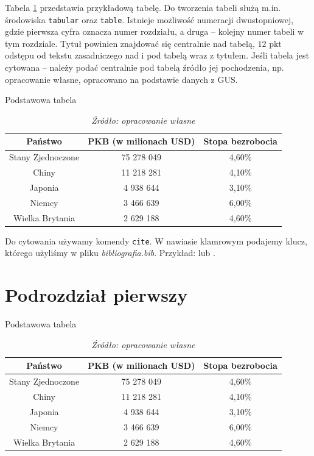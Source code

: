 \documentclass[polish,engineering]{wizthesis}
\begin{document}
Tabela \ref{tab:przykladowa} przedstawia przykładową tabelę. Do tworzenia tabeli służą m.in. środowiska \texttt{tabular} oraz \texttt{table}. Istnieje możliwość numeracji dwustopniowej, gdzie pierwsza cyfra oznacza numer rozdziału, a druga – kolejny numer tabeli w tym rozdziale. Tytuł powinien znajdować się centralnie nad tabelą, $12$ pkt odstępu od tekstu zasadniczego nad i pod tabelą wraz z tytułem. Jeśli tabela jest cytowana – należy podać centralnie pod tabelą źródło jej pochodzenia, np. opracowanie własne, opracowano na podstawie danych z GUS.
\begin{table}[ht]
  \caption{Podstawowa tabela}
  \centering
  \begin{tabular}{ccc}
    \hline
    \hline
    Państwo & PKB (w milionach USD) & Stopa bezrobocia \\ [0.5ex]
    \hline
    Stany Zjednoczone & 75 278 049 & 4,60\% \\
    Chiny             & 11 218 281 & 4,10\% \\
    Japonia           & 4 938 644  & 3,10\% \\
    Niemcy            & 3 466 639  & 6,00\% \\
    Wielka Brytania   & 2 629 188  & 4,60\% \\ [1ex]
    \hline
  \end{tabular}
  \caption*{\textit{Źródło: opracowanie własne}}
  \label{tab:przykladowa} 
\end{table}

Do cytowania używamy komendy \texttt{cite}. W nawiasie klamrowym podajemy klucz, którego użyliśmy w pliku \emph{bibliografia.bib}. Przykład: \cite{einstein} lub \cite[chap. 2]{latexcompanion}.


\section{Podrozdział pierwszy}

\begin{table}[ht]
  \caption{Podstawowa tabela}
  \centering
  \begin{tabular}{ccc}
    \hline
    \hline
    Państwo & PKB (w milionach USD) & Stopa bezrobocia \\ [0.5ex]
    \hline
    Stany Zjednoczone & 75 278 049 & 4,60\% \\
    Chiny             & 11 218 281 & 4,10\% \\
    Japonia           & 4 938 644  & 3,10\% \\
    Niemcy            & 3 466 639  & 6,00\% \\
    Wielka Brytania   & 2 629 188  & 4,60\% \\ [1ex]
    \hline
  \end{tabular}
  \caption*{\textit{Źródło: opracowanie własne}}
  \label{tab:przykladowa2} 
\end{table}
\end{document}
